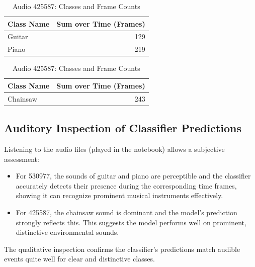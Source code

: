 \documentclass{article}
\begin{document}
\begin{table}[ht]
\centering
\begin{minipage}{0.48\textwidth}
\centering
\caption{Audio 530977: Classes and Frame Counts}
\begin{tabular}{l r}
\hline
\textbf{Class Name} & \textbf{Sum over Time (Frames)} \\
\hline
Guitar & 129 \\
Piano  & 219 \\
\hline
\end{tabular}
\end{minipage}%
\hfill
\begin{minipage}{0.48\textwidth}
\centering
\caption{Audio 425587: Classes and Frame Counts}
\begin{tabular}{l r}
\hline
\textbf{Class Name} & \textbf{Sum over Time (Frames)} \\
\hline
Chainsaw & 243 \\
\hline
\end{tabular}
\end{minipage}
\end{table}

\subsection{Auditory Inspection of Classifier Predictions}
Listening to the audio files (played in the notebook) allows a subjective assessment:
\begin{itemize}
    \item For 530977, the sounds of guitar and piano are perceptible and the classifier accurately detects their presence during the corresponding time frames, showing it can recognize prominent musical instruments effectively.
    \item For 425587, the chainsaw sound is dominant and the model’s prediction strongly reflects this. This suggests the model performs well on prominent, distinctive environmental sounds.
\end{itemize}

The qualitative inspection confirms the classifier’s predictions match audible events quite well for clear and distinctive classes.
\end{document}
